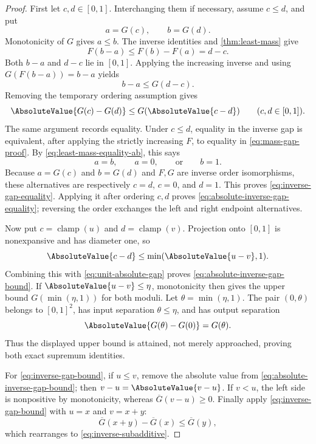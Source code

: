 \documentclass[11pt,oneside]{article}
\theoremstyle{definition}
\theoremstyle{remark}
\numberwithin{equation}{section}
\newcommand{\InvT}{\overline G}
\newcommand{\Clamp}{\operatorname{clamp}}
\begin{document}
\begin{proof}
First let $c,d\in[0,1]$.  Interchanging them if necessary, assume $c\le d$,
and put
\[
 a=G(c),\qquad b=G(d).
\]
Monotonicity of $G$ gives $a\le b$.  The inverse identities and
\cref{thm:least-mass} give
\begin{equation}\label{eq:mass-gap-proof}
 F(b-a)\le F(b)-F(a)=d-c.
\end{equation}
Both $b-a$ and $d-c$ lie in $[0,1]$.  Applying the increasing inverse and
using $G(F(b-a))=b-a$ yields
\[
 b-a\le G(d-c).
\]
Removing the temporary ordering assumption gives
\begin{equation}\label{eq:unit-absolute-gap}
 \AbsoluteValue{G(c)-G(d)}\le G(\AbsoluteValue{c-d})
 \qquad(c,d\in[0,1]).
\end{equation}
The same argument records equality.  Under $c\le d$, equality in the inverse
gap is equivalent, after applying the strictly increasing $F$, to equality in
\eqref{eq:mass-gap-proof}.  By \eqref{eq:least-mass-equality-ab}, this says
\[
 a=b,\qquad a=0,\qquad\text{or}\qquad b=1.
\]
Because $a=G(c)$ and $b=G(d)$ and $F,G$ are inverse order isomorphisms, these
alternatives are respectively $c=d$, $c=0$, and $d=1$.  This proves
\eqref{eq:inverse-gap-equality}.  Applying it after ordering $c,d$ proves
\eqref{eq:absolute-inverse-gap-equality}; reversing the order exchanges the
left and right endpoint alternatives.

Now put $c=\Clamp(u)$ and $d=\Clamp(v)$.  Projection onto $[0,1]$ is
nonexpansive and has diameter one, so
\[
 \AbsoluteValue{c-d}\le\min(\AbsoluteValue{u-v},1).
\]
Combining this with \eqref{eq:unit-absolute-gap} proves
\eqref{eq:absolute-inverse-gap-bound}.  If $\AbsoluteValue{u-v}\le\eta$, monotonicity
then gives the upper bound $G(\min(\eta,1))$ for both moduli.  Let
$\theta=\min(\eta,1)$.  The pair $(0,\theta)$ belongs to $[0,1]^2$, has input
separation $\theta\le\eta$, and has output separation
\[
 \AbsoluteValue{G(\theta)-G(0)}=G(\theta).
\]
Thus the displayed upper bound is attained, not merely approached, proving
both exact supremum identities.

For \eqref{eq:inverse-gap-bound}, if $u\le v$, remove the absolute value from
\eqref{eq:absolute-inverse-gap-bound}; then $v-u=\AbsoluteValue{v-u}$.  If $v<u$, the
left side is nonpositive by monotonicity, whereas $\InvT(v-u)\ge0$.
Finally apply \eqref{eq:inverse-gap-bound} with $u=x$ and $v=x+y$:
\[
 \InvT(x+y)-\InvT(x)\le\InvT(y),
\]
which rearranges to \eqref{eq:inverse-subadditive}.
\end{proof}
\end{document}
